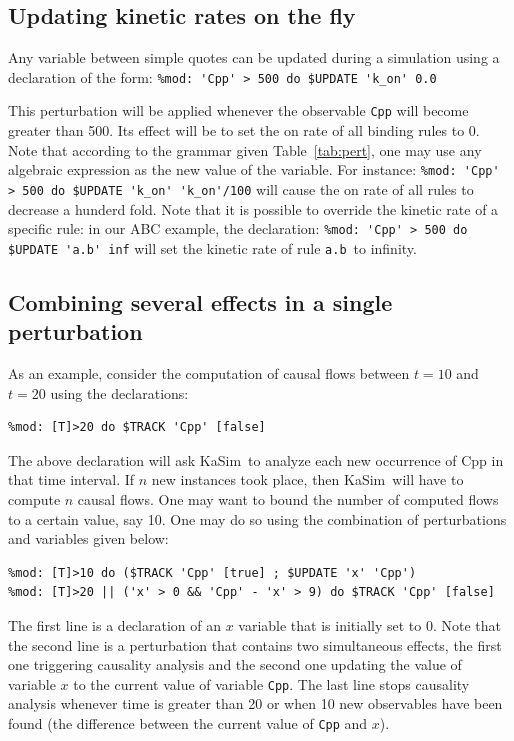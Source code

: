 \documentclass[11pt]{book}
\def\KaSim{\textsf{KaSim}}
\def\ttt#1{\texttt{#1}}
\def\var#1{{\textquotesingle}#1{\textquotesingle}}
\def\noi{\noindent}
\begin{document}
\subsection{Updating kinetic rates on the fly}

Any variable between simple quotes can be updated during a simulation using a declaration of the form:
\lstinline[language=kappa]!%mod: 'Cpp' > 500 do $UPDATE 'k_on' 0.0!

This perturbation will be applied whenever the observable \ttt{\var{Cpp}} will become greater than 500. Its effect will be to set the on rate of all binding rules to 0. Note that according to the grammar given Table~\ref{tab:pert}, one may use any algebraic expression as the new value of the variable. For instance:
\lstinline[language=kappa]!%mod: 'Cpp' > 500 do $UPDATE 'k_on' 'k_on'/100!
\noi will cause the on rate of all rules to decrease a hunderd fold. Note that it is possible to override the kinetic rate of a specific rule:  in our ABC example, the declaration:
\lstinline[language=kappa]!%mod: 'Cpp' > 500 do $UPDATE 'a.b' inf!
\noi will set the kinetic rate of rule \ttt{\var{a.b}}~to infinity.

\subsection{Combining several effects in a single perturbation}
As an example, consider the computation of causal flows between $t=10$ and $t=20$ using the declarations:
\begin{lstlisting}[language=kappa]
%mod: [T]>10 do $TRACK 'Cpp' [true]
%mod: [T]>20 do $TRACK 'Cpp' [false]
\end{lstlisting}

The above declaration will ask \KaSim~to analyze each new occurrence of \var{Cpp} in that time interval. If $n$ new instances took place, then \KaSim~will have to compute $n$ causal flows. One may want to bound the number of computed flows to a certain value, say 10. One may do so using the combination of perturbations and variables given below:
\begin{lstlisting}[language=kappa]
%var: 'x' 0
%mod: [T]>10 do ($TRACK 'Cpp' [true] ; $UPDATE 'x' 'Cpp')
%mod: [T]>20 || ('x' > 0 && 'Cpp' - 'x' > 9) do $TRACK 'Cpp' [false]
\end{lstlisting}
The first line is a declaration of an $x$ variable that is initially set to 0. Note that the second line is a perturbation that contains two simultaneous effects, the first one triggering causality analysis and the second one updating the value of variable $x$ to the current value of variable \ttt{\var{Cpp}}.
The last line stops causality analysis whenever time is greater than 20 or when 10 new observables have been found (the difference between the current value of \ttt{\var{Cpp}} and $x$).
\end{document}
